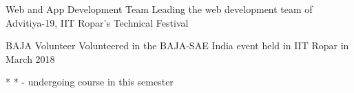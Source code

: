 
\begin{misc}


\cvskill
    {Web and App Development Team} %
    {{Leading the web development team of Advitiya-19, IIT Ropar's Technical Festival}}

\cvskill
    {BAJA Volunteer} %
    {{Volunteered in the BAJA-SAE India event held in IIT Ropar in March 2018}}

   
    \cvskill
    {*} %
    {{* - undergoing course in this semester}}



\end{misc}
